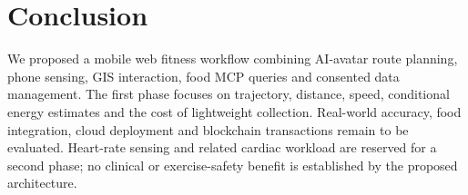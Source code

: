 \section{Conclusion}\label{sec:conclusion}
We proposed a mobile web fitness workflow combining AI-avatar route planning, phone sensing, GIS interaction, food MCP queries and consented data management. The first phase focuses on trajectory, distance, speed, conditional energy estimates and the cost of lightweight collection. Real-world accuracy, food integration, cloud deployment and blockchain transactions remain to be evaluated. Heart-rate sensing and related cardiac workload are reserved for a second phase; no clinical or exercise-safety benefit is established by the proposed architecture.
